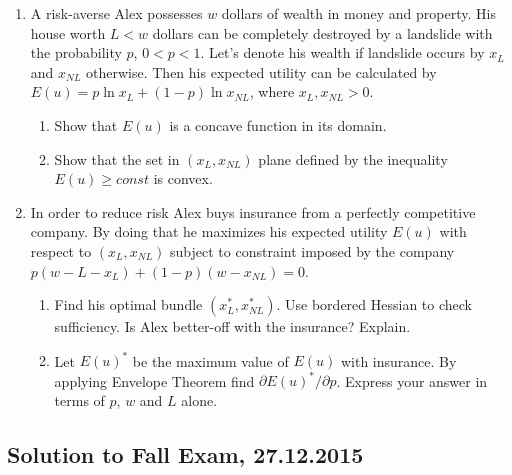 \begin{enumerate}[resume]
\item A risk-averse Alex possesses $w$ dollars of wealth in money and property.  His house worth $L < w$ dollars can be completely destroyed by a landslide with the probability $p$, $0 < p < 1$. Let’s denote his wealth if landslide occurs by $x_L$ and $x_{NL}$ otherwise. Then his expected utility can be calculated by $E(u) = p \ln x_L + (1-p) \ln x_{NL}$, where $x_L, x_{NL} > 0$.
\begin{enumerate}
\item Show that $E(u)$ is a concave function in its domain.
\item Show that the set in  $(x_L, x_{NL})$ plane defined by the inequality $E(u)\geq const$  is convex.
\end{enumerate}

\item In order to reduce risk Alex buys insurance from a perfectly competitive company. By doing that he maximizes his expected utility $E(u)$ with respect to $(x_L, x_{NL})$ subject to constraint imposed by the company $p(w-L-x_L)+(1-p)(w-x_{NL})=0$.
\begin{enumerate}
\item  Find his optimal bundle  $(x_L^*, x_{NL}^*)$. Use bordered Hessian to check sufficiency. Is Alex better-off with the insurance? Explain.
\item Let $E(u)^*$ be the maximum value of $E(u)$ with insurance. By applying Envelope Theorem find $\partial E(u)^* / \partial p$. Express your answer in terms of $p$, $w$ and $L$ alone.
\end{enumerate}


\end{enumerate}

\subsection{Solution to Fall Exam, 27.12.2015}

